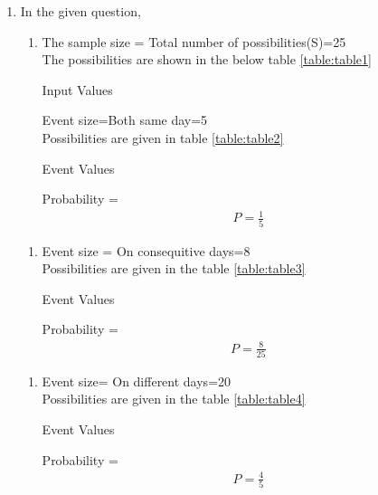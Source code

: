 \renewcommand{\theequation}{\theenumi}
\begin{enumerate}[label=\arabic*.,ref=\thesubsubsection.\theenumi]
\item In the given question,
\begin{enumerate}
\item The sample size = Total number of possibilities(S)=25
\\
The possibilities are shown in the below table \ref{table:table1}
\begin{table}[ht!]
\centering

\caption{Input Values}
\label{table:table1}	
\end{table}
Event size=Both same day=5
\\
Possibilities are given in table \ref{table:table2}
\begin{table}[ht!]
\centering

\caption{Event Values}
\label{table:table2}	
\end{table}
Probability =
\begin{align}
P=\frac{1}{5}
\end{align}
\end{enumerate}
\begin{enumerate}
\item Event size = On consequitive days=8
\\
Possibilities are given in the table \ref{table:table3}
\begin{table}[ht!]
\centering

\caption{Event Values}
\label{table:table3}	
\end{table}
Probability =
\begin{align}
P=\frac{8}{25}
\end{align}
\end{enumerate}
\begin{enumerate}
\item Event size= On different days=20
\\
Possibilities are given in the table \ref{table:table4}
\begin{table}[ht!]
\centering

\caption{Event Values}
\label{table:table4}	
\end{table}
Probability =
\begin{align}
P=\frac{4}{5}
\end{align}
\end{enumerate}
\end{enumerate}